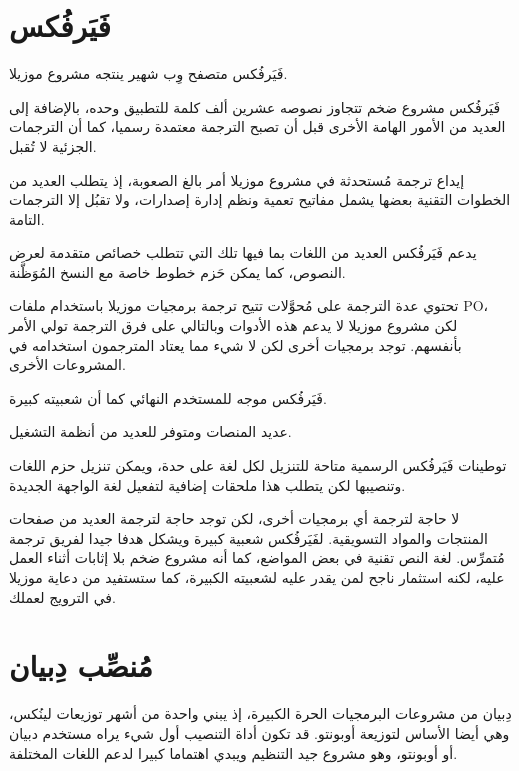 \section{فَيَرفُكس}
فَيَرفُكس متصفح وِب شهير ينتجه مشروع موزيلا.

\startitemize[1]
\item فَيَرفُكس مشروع ضخم تتجاوز نصوصه عشرين ألف كلمة للتطبيق وحده،
بالإضافة إلى العديد من الأمور الهامة الأخرى قبل أن تصبح الترجمة معتمدة
رسميا، كما أن الترجمات الجزئية لا تُقبل.
\item إيداع ترجمة مُستحدثة في مشروع موزيلا أمر بالغ الصعوبة، إذ يتطلب
العديد من الخطوات التقنية بعضها يشمل مفاتيح تعمية ونظم إدارة إصدارات،
ولا تقبُل إلا الترجمات التامة.
\item يدعم فَيَرفُكس العديد من اللغات بما فيها تلك التي تتطلب خصائص
متقدمة لعرض النصوص، كما يمكن حَزم خطوط خاصة مع النسخ المُوَظَّنة.
\item تحتوي عدة الترجمة على مُحوَّلات تتيح ترجمة برمجيات موزيلا باستخدام
ملفات PO، لكن مشروع موزيلا لا يدعم هذه الأدوات وبالتالي على فرق الترجمة
تولي الأمر بأنفسهم. توجد برمجيات أخرى لكن لا شيء مما يعتاد المترجمون
استخدامه في المشروعات الأخرى.
\item فَيَرفُكس موجه للمستخدم النهائي كما أن شعبيته كبيرة.
\item عديد المنصات ومتوفر للعديد من أنظمة التشغيل.
\item توطينات فَيَرفُكس الرسمية متاحة للتنزيل لكل لغة على حدة، ويمكن
تنزيل حزم اللغات وتنصيبها لكن يتطلب هذا ملحقات إضافية لتفعيل لغة
الواجهة الجديدة.
\item لا حاجة لترجمة أي برمجيات أخرى، لكن توجد حاجة لترجمة العديد من
صفحات المنتجات والمواد التسويقية.
\stopitemize
لفَيَرفُكس شعبية كبيرة ويشكل هدفا جيدا لفريق ترجمة مُتمرِّس. لغة النص
تقنية في بعض المواضع، كما أنه مشروع ضخم بلا إثابات أثناء العمل عليه،
لكنه استثمار ناجح لمن يقدر عليه لشعبيته الكبيرة، كما ستستفيد من دعاية
موزيلا في الترويج لعملك.

\section{مُنصِّب دِبيان}
دِبيان من مشروعات البرمجيات الحرة الكبيرة، إذ يبني واحدة من أشهر توزيعات
لينُكس، وهي أيضا الأساس لتوزيعة أوبونتو. قد تكون أداة التنصيب أول شيء
يراه مستخدم دبيان أو أوبونتو، وهو مشروع جيد التنظيم ويبدي اهتماما كبيرا
لدعم اللغات المختلفة.

